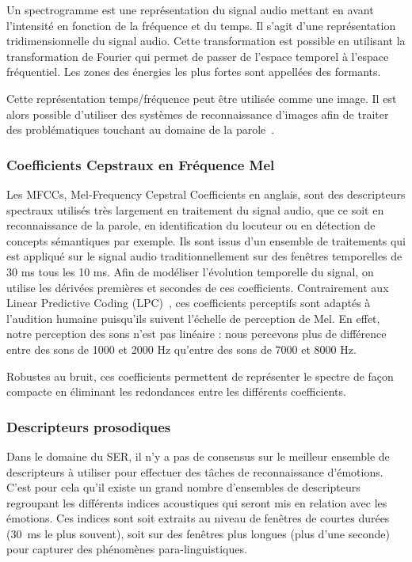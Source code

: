 Un spectrogramme est une représentation du signal audio mettant en avant l'intensité en fonction de la fréquence et du temps. %
Il s'agit d'une représentation tridimensionnelle du signal audio. Cette transformation est possible en utilisant la transformation de Fourier qui permet de passer de l'espace temporel à l'espace fréquentiel. Les zones des énergies les plus fortes sont appellées des formants.

Cette représentation temps/fréquence peut être utilisée comme une image. Il est alors possible d'utiliser des systèmes de reconnaissance d'images afin de traiter des problématiques touchant au domaine de la parole~\cite{Stolar2017}.


\subsubsection{Coefficients Cepstraux en Fréquence Mel}
Les MFCCs, Mel-Frequency Cepstral Coefficients en anglais, sont des descripteurs spectraux utilisés très largement en traitement du signal audio, que ce soit en reconnaissance de la parole, en identification du locuteur ou en détection de concepts sémantiques par exemple. Ils sont issus d'un ensemble de traitements qui est appliqué sur le signal audio traditionnellement sur des fenêtres temporelles de 30 ms tous les 10 ms. Afin de modéliser l'évolution temporelle du signal, on utilise les dérivées premières et secondes de ces coefficients. Contrairement aux Linear Predictive Coding (LPC)~\cite{Rabiner1993},
ces coefficients perceptifs sont adaptés à l'audition humaine puisqu'ils suivent l'échelle de perception de Mel. En effet, notre perception des sons n'est pas linéaire : nous percevons plus de différence entre des sons de 1000 et 2000 Hz qu'entre des sons de 7000 et 8000 Hz.

Robustes au bruit, ces coefficients permettent de représenter le spectre de façon compacte en éliminant les redondances entre les différents coefficients.


\subsubsection{Descripteurs prosodiques}
Dans le domaine du SER, il n'y a pas de consensus sur le meilleur ensemble de descripteurs à utiliser pour effectuer des tâches de reconnaissance d'émotions. C'est pour cela qu'il existe un grand nombre d'ensembles de descripteurs regroupant les différents indices acoustiques qui seront mis en relation avec les émotions. Ces indices sont soit extraits au niveau de fenêtres de courtes durées (30~ms le plus souvent), soit sur des fenêtres plus longues (plus d'une seconde) pour capturer des phénomènes para-linguistiques.


